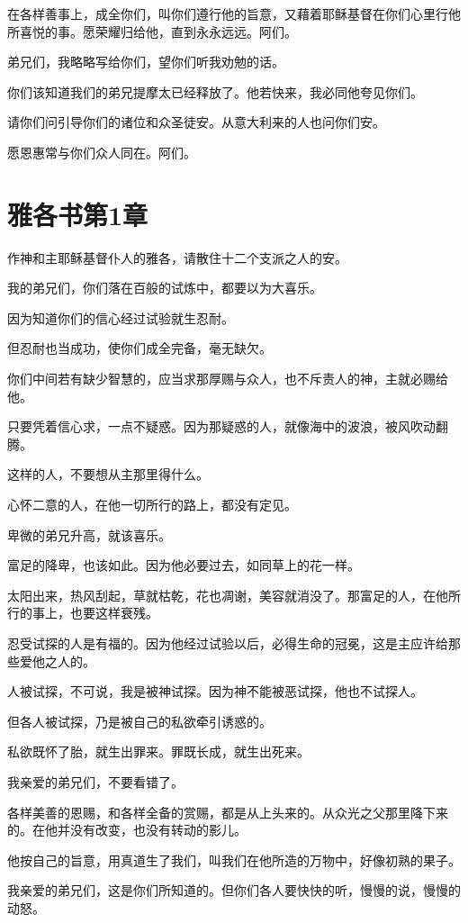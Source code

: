 \documentclass[12pt,oneside]{book}
\begin{document}
在各样善事上，成全你们，叫你们遵行他的旨意，又藉着耶稣基督在你们心里行他所喜悦的事。愿荣耀归给他，直到永永远远。阿们。

弟兄们，我略略写给你们，望你们听我劝勉的话。

你们该知道我们的弟兄提摩太已经释放了。他若快来，我必同他夸见你们。

请你们问引导你们的诸位和众圣徒安。从意大利来的人也问你们安。

愿恩惠常与你们众人同在。阿们。

\chapter{雅各书第1章}
作神和主耶稣基督仆人的雅各，请散住十二个支派之人的安。

我的弟兄们，你们落在百般的试炼中，都要以为大喜乐。

因为知道你们的信心经过试验就生忍耐。

但忍耐也当成功，使你们成全完备，毫无缺欠。

你们中间若有缺少智慧的，应当求那厚赐与众人，也不斥责人的神，主就必赐给他。

只要凭着信心求，一点不疑惑。因为那疑惑的人，就像海中的波浪，被风吹动翻腾。

这样的人，不要想从主那里得什么。

心怀二意的人，在他一切所行的路上，都没有定见。

卑微的弟兄升高，就该喜乐。

富足的降卑，也该如此。因为他必要过去，如同草上的花一样。

太阳出来，热风刮起，草就枯乾，花也凋谢，美容就消没了。那富足的人，在他所行的事上，也要这样衰残。

忍受试探的人是有福的。因为他经过试验以后，必得生命的冠冕，这是主应许给那些爱他之人的。

人被试探，不可说，我是被神试探。因为神不能被恶试探，他也不试探人。

但各人被试探，乃是被自己的私欲牵引诱惑的。

私欲既怀了胎，就生出罪来。罪既长成，就生出死来。

我亲爱的弟兄们，不要看错了。

各样美善的恩赐，和各样全备的赏赐，都是从上头来的。从众光之父那里降下来的。在他并没有改变，也没有转动的影儿。

他按自己的旨意，用真道生了我们，叫我们在他所造的万物中，好像初熟的果子。

我亲爱的弟兄们，这是你们所知道的。但你们各人要快快的听，慢慢的说，慢慢的动怒。
\end{document}

